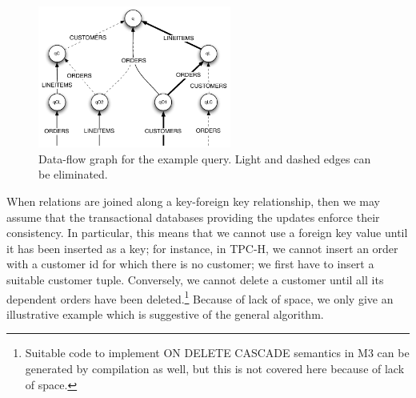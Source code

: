\begin{figure}
\begin{center}
\includegraphics[width=2.5in]{images/q12_graph.pdf}

\vspace{-4mm}

\caption{Data-flow graph for the example query.
Light and dashed edges can be eliminated.}
\label{fig:dataflow}
\end{center}
\end{figure}


When relations are joined along a key-foreign key relationship,
then we may assume that the transactional databases providing the updates
enforce their consistency. In particular, this means that we cannot use
a foreign key value until it has been inserted as a key; for instance, in
TPC-H, we cannot insert an order with a customer id for which there is
no customer; we first have to insert a suitable customer tuple.
Conversely, we cannot delete a customer until all its dependent orders
have been deleted.\footnote{Suitable code to implement ON DELETE CASCADE
semantics in M3 can be generated by compilation as well, but this is not
covered here because of lack of space.}
Because of lack of space, we only give an illustrative example which
is suggestive of the general algorithm.




